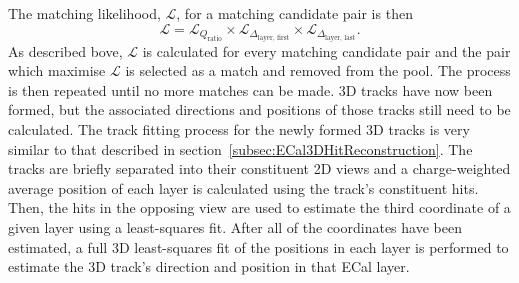 \newline
\newline
The matching likelihood, $\mathcal{L}$, for a matching candidate pair is then
\begin{equation}
  \mathcal{L} = \mathcal{L}_{Q_{\textrm{ratio}}} \times \mathcal{L}_{\Delta_{\textrm{layer, first}}} \times \mathcal{L}_{\Delta_{\textrm{layer, last}}}.
\end{equation}
As described bove, $\mathcal{L}$ is calculated for every matching candidate pair and the pair which maximise $\mathcal{L}$ is selected as a match and removed from the pool.  The process is then repeated until no more matches can be made.
\newline
\newline
3D tracks have now been formed, but the associated directions and positions of those tracks still need to be calculated.  The track fitting process for the newly formed 3D tracks is very similar to that described in section~\ref{subsec:ECal3DHitReconstruction}.  The tracks are briefly separated into their constituent 2D views and a charge-weighted average position of each layer is calculated using the track's constituent hits.  Then, the hits in the opposing view are used to estimate the third coordinate of a given layer using a least-squares fit.  After all of the coordinates have been estimated, a full 3D least-squares fit of the positions in each layer is performed to estimate the 3D track's direction and position in that ECal layer.

